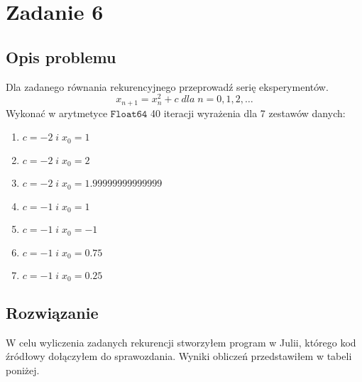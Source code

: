 \section{Zadanie 6}
\subsection{Opis problemu}
Dla zadanego równania rekurencyjnego przeprowadź serię eksperymentów.
$$ x_{n+1} = x_{n}^2 + c\; dla\; n = 0, 1, 2,\ldots$$
Wykonać w arytmetyce $ \mathtt{Float64} $ 40 iteracji wyrażenia dla 7 zestawów danych:
\begin{enumerate}
  \item $ c = -2 \;i\; x_0 = 1 $
  \item $ c = -2 \;i\; x_0 = 2 $
  \item $ c = -2 \;i\; x_0 = 1.99999999999999 $
  \item $ c = -1 \;i\; x_0 = 1 $
  \item $ c = -1 \;i\; x_0 = -1 $
  \item $ c = -1 \;i\; x_0 = 0.75 $
  \item $ c = -1 \;i\; x_0 = 0.25 $
\end{enumerate}
\subsection{Rozwiązanie}
W celu wyliczenia zadanych rekurencji stworzyłem program w Julii, którego kod źródłowy dołączyłem do sprawozdania. Wyniki obliczeń przedstawiłem w tabeli poniżej.
